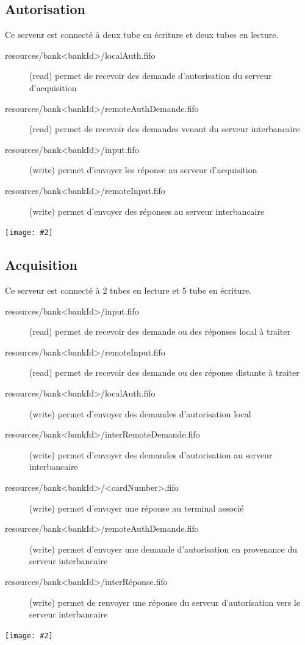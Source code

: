 \documentclass[french, a4paper, 12pt, titlepage]{article}
\newcommand{\graph}[2]{
\medskip
	\begin{center}
		\texttt{[image: \#2]}
	\end{center}
\medskip
}
\begin{document}
\subsection{Autorisation}
Ce serveur est connecté à deux tube en écriture et deux tubes en lecture.
\begin{description}
	\item[resources/bank<bankId>/localAuth.fifo] (read) permet de recevoir des demande d'autorisation du serveur d'acquisition
	\item[resources/bank<bankId>/remoteAuthDemande.fifo] (read) permet de recevoir des demandes venant du serveur interbancaire
	\item[resources/bank<bankId>/input.fifo] (write) permet d'envoyer les réponse au serveur d'acquisition
	\item[resources/bank<bankId>/remoteInput.fifo] (write) permet d'envoyer des réponses au serveur interbancaire
\end{description}
\graph{0.5}{autorisation}
\subsection{Acquisition}
Ce serveur est connecté à 2 tubes en lecture et 5 tube en écriture.
\begin{description}
	\item[resources/bank<bankId>/input.fifo] (read) permet de recevoir des demande ou des réponses local à traiter
	\item[resources/bank<bankId>/remoteInput.fifo] (read) permet de recevoir des demande ou des réponse distante à traiter
	\item[resources/bank<bankId>/localAuth.fifo] (write) permet d'envoyer des demandes d'autorisation local
	\item[resources/bank<bankId>/interRemoteDemande.fifo] (write) permet d'envoyer des demandes d'autorisation au serveur interbancaire
	\item[resources/bank<bankId>/<cardNumber>.fifo] (write) permet d'envoyer une réponse au terminal associé
	\item[resources/bank<bankId>/remoteAuthDemande.fifo] (write) permet d'envoyer une demande d'autorisation en provenance du serveur interbancaire
	\item[resources/bank<bankId>/interRéponse.fifo] (write) permet de renvoyer une réponse du serveur d'autorisation vers le serveur interbancaire
\end{description}
\graph{0.5}{acquisition}
\end{document}
